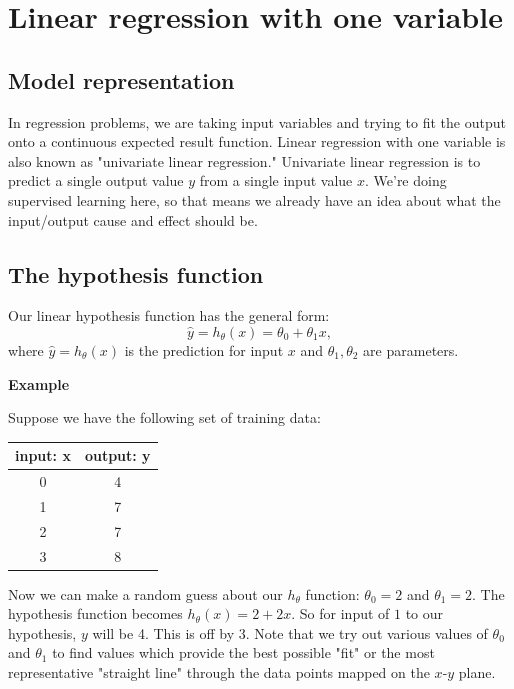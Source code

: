 \documentclass[a4paper,11pt]{report}
\begin{document}
\section{Linear regression with one variable}

\subsection*{Model representation}

In regression problems, we are taking input variables and trying to fit the output onto a continuous expected result function. Linear regression with one variable is also known as "univariate linear regression."
Univariate linear regression is to predict a single output value $y$ from a single input value $x$. We're doing supervised learning here, so that means we already have an idea about what the input/output cause and effect should be.

\subsection*{The hypothesis function}

Our linear hypothesis function has the general form:
\begin{equation}\label{eq:lin-reg-hyp}
\hat{y} = h_\theta(x) = \theta_0 + \theta_1x,
\end{equation}
where $\hat{y} = h_\theta(x)$ is the prediction for input $x$ and $\theta_1, \theta_2$ are parameters.

\textbf{Example}

Suppose we have the following set of training data:

\begin{center}
\begin{tabular}{ |c|c| }
 \hline
 input: x & output: y \\
 \hline
 0 & 4 \\ 1 & 7 \\ 2 & 7 \\ 3 & 8 \\
 \hline
\end{tabular}
\end{center}

Now we can make a random guess about our $h_\theta$ function: $\theta_0 = 2$ and $\theta_1 = 2$. The hypothesis function becomes $h_\theta(x) = 2 + 2x$.
So for input of $1$ to our hypothesis, $y$ will be 4. This is off by $3$. Note that we try out various values of $\theta_0$ and $\theta_1$ to find values which provide the best possible "fit" or the most representative "straight line" through the data points mapped on the $x$-$y$ plane.
\end{document}
